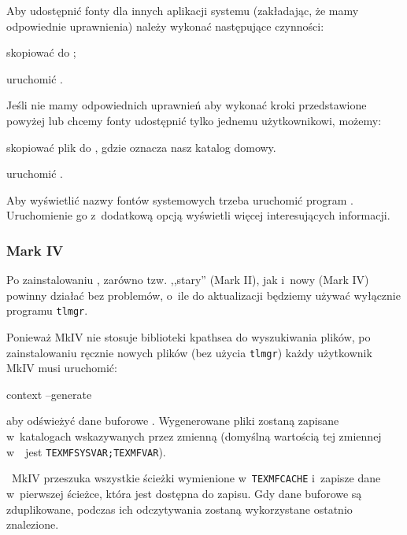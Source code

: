 \documentclass{article}
\begin{document}
Aby udostępnić fonty \TL{} dla innych aplikacji systemu
(zakładając, że mamy odpowiednie uprawnienia) należy wykonać
następujące czynności:
\begin{enumerate*}
\item skopiować  do
;
\item uruchomić .
\end{enumerate*}

Jeśli nie mamy odpowiednich uprawnień aby wykonać kroki przedstawione powyżej
lub chcemy  fonty \TL{} udostępnić tylko jednemu użytkownikowi, możemy:
\begin{enumerate*}
\item skopiować plik  do
   , gdzie \filename{~} oznacza nasz katalog domowy.
\item uruchomić .
\end{enumerate*}

Aby wyświetlić nazwy fontów systemowych trzeba uruchomić program .
Uruchomienie go z~dodatkową opcją  wyświetli
więcej interesujących informacji.


\subsubsection{\protect\ConTeXt{} Mark IV}
\label{sec:context-mkiv}

Po zainstalowaniu \TL, zarówno tzw. ,,stary'' \ConTeXt{} (Mark II), jak i~nowy
\ConTeXt{} (Mark IV) powinny działać  bez problemów, o~ile do aktualizacji będziemy
używać wyłącznie programu \verb+tlmgr+.

Ponieważ \ConTeXt{} MkIV nie stosuje biblioteki kpathsea do
wyszukiwania plików, po zainstalowaniu ręcznie nowych plików (bez użycia
\verb+tlmgr+) każdy użytkownik MkIV  musi uruchomić:
\begin{sverbatim}
context --generate
\end{sverbatim}
aby odświeżyć dane buforowe \ConTeXt.
Wygenerowane pliki zostaną zapisane w~katalogach wskazywanych przez
zmienną  (domyślną wartością tej zmiennej w~\TL\ jest
\verb+TEXMFSYSVAR;TEXMFVAR+).

\ConTeXt\ MkIV przeszuka wszystkie ścieżki wymienione w~\verb+TEXMFCACHE+
i~zapisze dane w~pierwszej ścieżce, która jest dostępna
do zapisu. Gdy dane buforowe są zduplikowane, podczas ich odczytywania
zostaną wykorzystane ostatnio znalezione.
\end{document}
